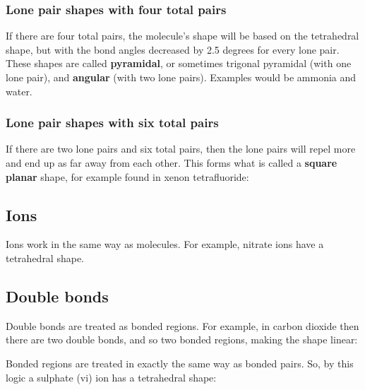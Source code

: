 \subsubsection{Lone pair shapes with four total pairs}
If there are four total pairs, the molecule's shape will be based on the tetrahedral shape, but with the bond angles decreased by 2.5 degrees for every lone pair. These shapes are called \textbf{pyramidal}, or sometimes trigonal pyramidal (with one lone pair), and \textbf{angular} (with two lone pairs). Examples would be ammonia and water.

\begin{center}
\end{center}
\begin{center}
\end{center}

\subsubsection{Lone pair shapes with six total pairs}
If there are two lone pairs and six total pairs, then the lone pairs will repel more and end up as far away from each other. This forms what is called a \textbf{square planar} shape, for example found in xenon tetrafluoride:

\begin{center}
\end{center}

\subsection{Ions}
Ions work in the same way as molecules. For example, nitrate ions have a tetrahedral shape.

\subsection{Double bonds}
Double bonds are treated as bonded regions. For example, in carbon dioxide then there are two double bonds, and so two bonded regions, making the shape linear:

\begin{center}
\end{center}

Bonded regions are treated in exactly the same way as bonded pairs. So, by this logic a sulphate (vi) ion has a tetrahedral shape:

\begin{center}
\end{center}
